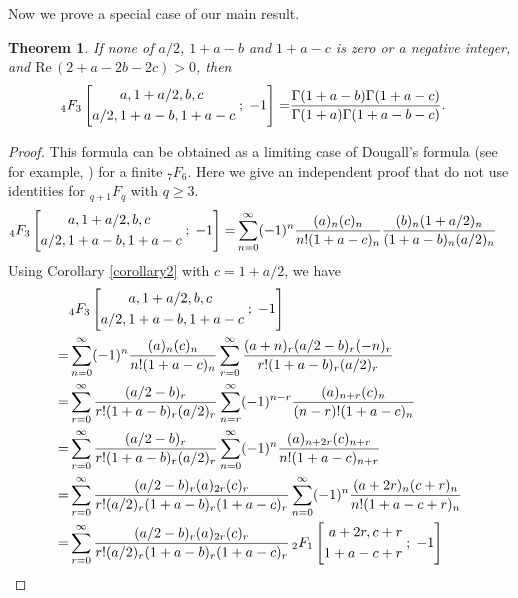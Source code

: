 \documentclass[reqno]{amsart}
\newtheorem{theorem}{Theorem}[section]
\theoremstyle{definition}
\theoremstyle{remark}
\numberwithin{equation}{section}
\begin{document}
Now we prove a special case of our main result.
\begin{theorem}\label{Theorem3}
If none of $a/2$, $1+a-b$ and $1+a-c$ is zero or a negative integer, and $\text{Re}\,(2+a-2b-2c)>0$, then
\begin{align*}
_4F_3\left[\begin{aligned} a, 1+a/2, b, c\hspace{0.8cm}\\ a/2, 1+a-b, 1+a-c\end{aligned}\;;\; -1\right]=&\frac{\Gamma(1+a-b)\Gamma(1+a-c)}{\Gamma(1+a)\Gamma(1+a-b-c)}.
\end{align*}
\end{theorem}
\begin{proof}
This formula can be obtained as a limiting case of Dougall's formula (see for example, \cite{4}) for a finite $_7F_6$. Here we give an independent proof that do not use identities for $_{q+1}F_q$ with $q\geq 3$.
\begin{align*}
_4F_3\left[\begin{aligned} a, 1+a/2, b, c\hspace{0.8cm}\\ a/2, 1+a-b, 1+a-c\end{aligned}\;;\; -1\right]=&
\sum_{n=0}^{\infty} (-1)^n\frac{(a)_n(c)_n}{n!(1+a-c)_n}\frac{(b)_n(1+a/2)_n}{(1+a-b)_n(a/2)_n}\end{align*}
Using Corollary \ref{corollary2} with $c=1+a/2$, we have
\begin{align*}
&_4F_3\left[\begin{aligned} a, 1+a/2, b, c\hspace{0.8cm}\\ a/2, 1+a-b, 1+a-c\end{aligned}\;;\; -1\right]\\
=&\sum_{n=0}^{\infty} (-1)^n\frac{(a)_n(c)_n}{n!(1+a-c)_n}\sum_{r=0}^{\infty} \frac{(a+n)_r(a/2-b)_r(-n)_r}{r! (1+a-b)_r(a/2)_r}\\
=&\sum_{r=0}^{\infty}\frac{(a/2-b)_r}{r! (1+a-b)_r(a/2)_r}\sum_{n=r}^{\infty}(-1)^{n-r}\frac{(a)_{n+r}(c)_n}{(n-r)!(1+a-c)_n}\\
=&\sum_{r=0}^{\infty}\frac{(a/2-b)_r}{r! (1+a-b)_r(a/2)_r}\sum_{n=0}^{\infty}(-1)^{n}\frac{(a)_{n+2r}(c)_{n+r}}{n!(1+a-c)_{n+r}}\\
=&\sum_{r=0}^{\infty}\frac{(a/2-b)_r(a)_{2r}(c)_r}{r! (a/2)_r(1+a-b)_r(1+a-c)_r}\sum_{n=0}^{\infty}(-1)^{n}\frac{(a+2r)_{n}(c+r)_{n}}{n!(1+a-c+r)_{n}}\\
=&\sum_{r=0}^{\infty}\frac{(a/2-b)_r(a)_{2r}(c)_r}{r! (a/2)_r(1+a-b)_r(1+a-c)_r}\,_2F_1\left[\begin{aligned} a+2r, c+r\\1+a-c+r\end{aligned}\;;\;-1\right]\end{align*}

\end{proof}
\end{document}
